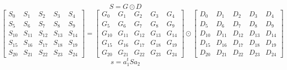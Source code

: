 \documentclass{article}%
\begin{document}
\[%
S = G \odot D%
\]%
\[%
\left[\begin{matrix}S_{0} & S_{1} & S_{2} & S_{3} & S_{4}\\S_{5} & S_{6} & S_{7} & S_{8} & S_{9}\\S_{10} & S_{11} & S_{12} & S_{13} & S_{14}\\S_{15} & S_{16} & S_{17} & S_{18} & S_{19}\\S_{20} & S_{21} & S_{22} & S_{23} & S_{24}\end{matrix}\right] = \left[\begin{matrix}G_{0} & G_{1} & G_{2} & G_{3} & G_{4}\\G_{5} & G_{6} & G_{7} & G_{8} & G_{9}\\G_{10} & G_{11} & G_{12} & G_{13} & G_{14}\\G_{15} & G_{16} & G_{17} & G_{18} & G_{19}\\G_{20} & G_{21} & G_{22} & G_{23} & G_{24}\end{matrix}\right] \odot \left[\begin{matrix}D_{0} & D_{1} & D_{2} & D_{3} & D_{4}\\D_{5} & D_{6} & D_{7} & D_{8} & D_{9}\\D_{10} & D_{11} & D_{12} & D_{13} & D_{14}\\D_{15} & D_{16} & D_{17} & D_{18} & D_{19}\\D_{20} & D_{21} & D_{22} & D_{23} & D_{24}\end{matrix}\right]%
\]%
\[%
s = a_1^t S a_2%
\]%
\end{document}
